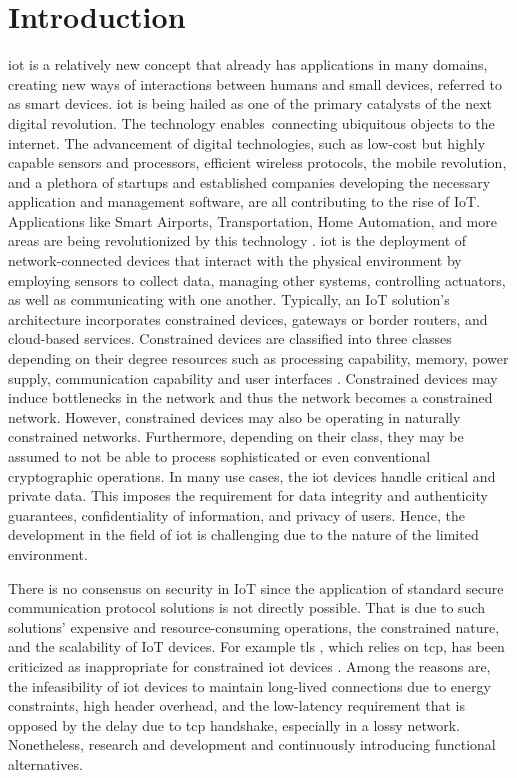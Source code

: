 \chapter{Introduction}
\label{ch:introduction}

\gls{iot} is a relatively new concept that already has applications in many domains, creating new ways of interactions between humans and small devices, referred to as smart devices. \gls{iot} is being hailed as one of the primary catalysts of the next digital revolution. The technology enables connecting ubiquitous objects to the internet. The advancement of digital technologies, such as low-cost but highly capable sensors and processors, efficient wireless protocols, the mobile revolution, and a plethora of startups and established companies developing the necessary application and management software, are all contributing to the rise of IoT.
Applications like Smart Airports, Transportation, Home Automation, and more areas are being revolutionized by this technology \cite{marksteiner2017overview}.
\gls{iot} is the deployment of network-connected devices that interact with the physical environment by employing sensors to collect data, managing other systems, controlling actuators, as well as communicating with one another. Typically, an IoT solution's architecture incorporates constrained devices, gateways or border routers, and cloud-based services. Constrained devices are classified into three classes depending on their degree resources such as processing capability, memory, power supply, communication capability and user interfaces \cite{rfc7228}. Constrained devices may induce bottlenecks in the network and thus the network becomes a constrained network. However, constrained devices may also be operating in naturally constrained networks. Furthermore, depending on their class, they may be assumed to not be able to process sophisticated or even conventional cryptographic operations. In many use cases, the \gls{iot} devices handle critical and private data. This imposes the requirement for data integrity and authenticity guarantees, confidentiality of information, and privacy of users. Hence, the development in the field of \gls{iot} is challenging due to the nature of the limited environment.
\par
There is no consensus on security in IoT since the application of standard secure communication protocol solutions is not directly possible. That is due to such solutions' expensive and resource-consuming operations, the constrained nature, and the scalability of IoT devices. For example \gls{tls} \cite{rfc5246}, which relies on \gls{tcp}, has been criticized as inappropriate for constrained \gls{iot} devices \cite{shang2016challenges}. Among the reasons are, the infeasibility of \gls{iot} devices to maintain long-lived connections due to energy constraints, high header overhead, and the low-latency requirement that is opposed by the delay due to \gls{tcp} handshake, especially in a lossy network. Nonetheless, research and development and continuously introducing functional alternatives. 
